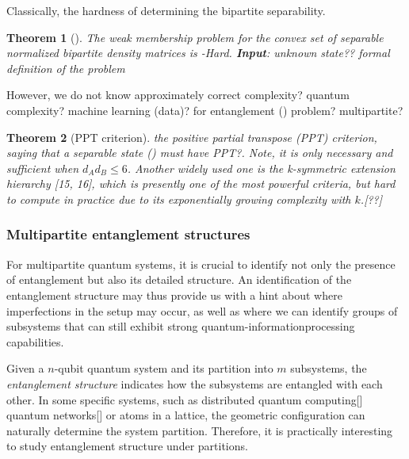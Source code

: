 \documentclass[
10pt,
aps,
pra,
linenumbers,
floatfix,
]{revtex4-2}
\theoremstyle{plain}
\newtheorem{theorem}{Theorem}
\newtheorem{question}{Question}
\theoremstyle{definition}
\newcommand{\ppt}{\textup{PPT}}
\begin{document}
Classically, the hardness of determining the bipartite separability.
\begin{theorem}[\cite{gurvitsClassicalDeterministicComplexity2003}]
	The weak membership problem for the convex set of separable normalized bipartite density matrices is -Hard.
	\textbf{Input}: unknown state?? formal definition of the problem
\end{theorem}
	However, we do not know 
	approximately correct complexity? quantum complexity? machine learning (data)? for entanglement () problem? multipartite?

\begin{theorem}[PPT criterion]\label{thm:ppt}
	the positive partial transpose (\ppt) criterion, saying that a separable state () must have PPT?.
	Note, it is only necessary and sufficient when $d_A d_B \le 6$.
	Another widely used one is the k-symmetric extension hierarchy [15, 16], which is presently one of the most powerful criteria, but hard to compute in practice due to its exponentially growing complexity with $k$.[??]
\end{theorem}

\subsubsection{Multipartite entanglement structures}
For multipartite quantum systems, it is crucial to identify not only the presence of entanglement but also its detailed structure.
An identification of the entanglement structure may thus provide us with a hint about where imperfections in the setup may occur, as well as where we can identify groups of subsystems that can still exhibit strong quantum-informationprocessing capabilities.

Given a $n$-qubit quantum system and its partition into $m$ subsystems, the \emph{entanglement structure} indicates how the subsystems are entangled with each other.
In some specific systems, such as distributed quantum computing[] quantum networks[] or atoms in a lattice, the geometric configuration can naturally determine the system partition.
Therefore, it is practically interesting to study entanglement structure under partitions.
\end{document}

